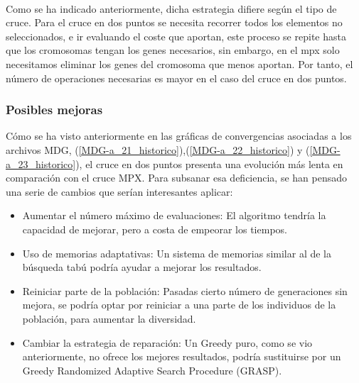 	\paragraph{}Como se ha indicado anteriormente, dicha estrategia difiere según el tipo de cruce. Para el cruce en dos puntos se necesita recorrer todos los elementos no seleccionados, e ir evaluando el coste que aportan, este proceso se repite hasta que los cromosomas tengan los genes necesarios, sin embargo, en el mpx solo necesitamos eliminar los genes del cromosoma que menos aportan. Por tanto, el número de operaciones necesarias es mayor en el caso del cruce en dos puntos.
	
	
	\subsubsection{Posibles mejoras}
	
	Cómo se ha visto anteriormente en las gráficas de convergencias asociadas a los archivos MDG, (\ref{MDG-a_21_historico}),(\ref{MDG-a_22_historico}) y (\ref{MDG-a_23_historico}), el cruce en dos puntos presenta una evolución más lenta en comparación con el cruce MPX. Para subsanar esa deficiencia, se han pensado una serie de cambios que serían interesantes aplicar:
	
	\begin{itemize}
		\item Aumentar el número máximo de evaluaciones: El algoritmo tendría la capacidad de mejorar, pero a costa de empeorar los tiempos.
		\item Uso de memorias adaptativas: Un sistema de memorias similar al de la búsqueda tabú podría ayudar a mejorar los resultados.
		\item Reiniciar parte de la población: Pasadas cierto número de generaciones sin mejora, se podría optar por reiniciar a una parte de los individuos de la población, para aumentar la diversidad.
		\item Cambiar la estrategia de reparación: Un Greedy puro, como se vio anteriormente, no ofrece los mejores resultados, podría sustituirse por un Greedy Randomized Adaptive Search Procedure (GRASP).
		
	\end{itemize} 
	
	
	

	
	\paragraph{} 
	
